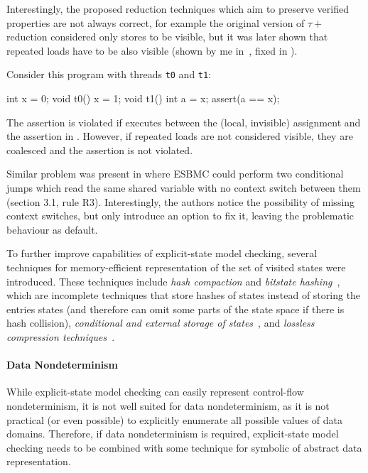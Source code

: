 Interestingly, the proposed reduction techniques which aim to preserve verified
properties are not always correct, for example the original version of $\tau+$
reduction considered only stores to be visible, but it was later shown that
repeated loads have to be also visible (shown by me in~, fixed in
).\begin{marginnote}%
Consider this program with threads \texttt{t0} and \texttt{t1}:

\medskip
\begin{cppcode}
  int x = 0;
  void t0() {
    x = 1;
  }
  void t1() {
    int a = x;
    assert(a == x);
  }
\end{cppcode}
\smallskip

The assertion is violated if  executes between the (local, invisible)
assignment and the assertion in .
However, if repeated loads are not considered visible, they are coalesced and
the assertion is not violated.
\end{marginnote}
%
Similar problem was present in  where ESBMC could perform two conditional jumps which read the same shared variable with no context switch between them (section 3.1, rule R3).
Interestingly, the authors notice the possibility of missing context switches, but only introduce an option to fix it, leaving the problematic behaviour as default.

To further improve capabilities of explicit-state model checking, several
techniques for memory-efficient representation of the set of visited states
were introduced.
These techniques include \emph{hash compaction} and \emph{bitstate
hashing}~, which are incomplete techniques that store
hashes of states instead of storing the entries states (and therefore can omit
some parts of the state space if there is hash collision),
\emph{conditional and external storage of states}~, and
\emph{lossless compression techniques}~.

\paragraph{Data Nondeterminism}
While explicit-state model checking can easily represent control-flow
nondeterminism, it is not well suited for data nondeterminism, as it is not
practical (or even possible) to explicitly enumerate all possible values of
data domains.
Therefore, if data nondeterminism is required, explicit-state model checking
needs to be combined with some technique for symbolic of abstract data
representation.

